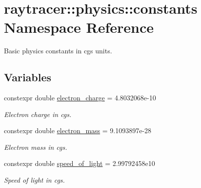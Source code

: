\hypertarget{namespaceraytracer_1_1physics_1_1constants}{}\section{raytracer\+:\+:physics\+:\+:constants Namespace Reference}
\label{namespaceraytracer_1_1physics_1_1constants}


Basic physics constants in cgs units.  


\subsection*{Variables}
\begin{DoxyCompactItemize}
\item 
\mbox{\label{namespaceraytracer_1_1physics_1_1constants_a75bbaca42e96329a8a92ca9334ab6180}} 
constexpr double \hyperlink{namespaceraytracer_1_1physics_1_1constants_a75bbaca42e96329a8a92ca9334ab6180}{electron\+\_\+charge} = 4.\+8032068e-\/10
\begin{DoxyCompactList}\small\item\em Electron charge in cgs. \end{DoxyCompactList}\item 
\mbox{\label{namespaceraytracer_1_1physics_1_1constants_a64e3ef2feb1dddb1755c438a4c95b81c}} 
constexpr double \hyperlink{namespaceraytracer_1_1physics_1_1constants_a64e3ef2feb1dddb1755c438a4c95b81c}{electron\+\_\+mass} = 9.\+1093897e-\/28
\begin{DoxyCompactList}\small\item\em Electron mass in cgs. \end{DoxyCompactList}\item 
\mbox{\label{namespaceraytracer_1_1physics_1_1constants_acf745b46711f662cd55c00652f6acd57}} 
constexpr double \hyperlink{namespaceraytracer_1_1physics_1_1constants_acf745b46711f662cd55c00652f6acd57}{speed\+\_\+of\+\_\+light} = 2.\+99792458e10
\begin{DoxyCompactList}\small\item\em Speed of light in cgs. \end{DoxyCompactList}\item 
\mbox{\label{namespaceraytracer_1_1physics_1_1constants_a5783938c1c16153b5f777e08bd62641f}} 

\end{DoxyCompactItemize}
